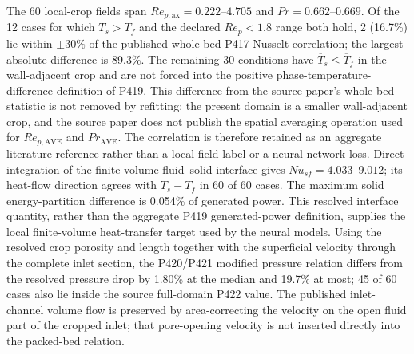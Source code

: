 The 60 local-crop fields span $Re_{p,\mathrm{ax}}=0.222$--$4.705$ and $Pr=0.662$--$0.669$. Of the 12 cases for which $\overline{T}_s>\overline{T}_f$ and the declared $Re_p<1.8$ range both hold, 2 (16.7\%) lie within $\pm30\%$ of the published whole-bed P417 Nusselt correlation; the largest absolute difference is 89.3\%. The remaining 30 conditions have $\overline{T}_s\leq\overline{T}_f$ in the wall-adjacent crop and are not forced into the positive phase-temperature-difference definition of P419. This difference from the source paper's whole-bed statistic is not removed by refitting: the present domain is a smaller wall-adjacent crop, and the source paper does not publish the spatial averaging operation used for $Re_{p,\mathrm{AVE}}$ and $Pr_{\mathrm{AVE}}$. The correlation is therefore retained as an aggregate literature reference rather than a local-field label or a neural-network loss. Direct integration of the finite-volume fluid--solid interface gives $Nu_{sf}=4.033$--$9.012$; its heat-flow direction agrees with $\overline{T}_s-\overline{T}_f$ in 60 of 60 cases. The maximum solid energy-partition difference is 0.054\% of generated power. This resolved interface quantity, rather than the aggregate P419 generated-power definition, supplies the local finite-volume heat-transfer target used by the neural models.
Using the resolved crop porosity and length together with the superficial velocity through the complete inlet section, the P420/P421 modified pressure relation differs from the resolved pressure drop by 1.80\% at the median and 19.7\% at most; 45 of 60 cases also lie inside the source full-domain P422 value. The published inlet-channel volume flow is preserved by area-correcting the velocity on the open fluid part of the cropped inlet; that pore-opening velocity is not inserted directly into the packed-bed relation.
